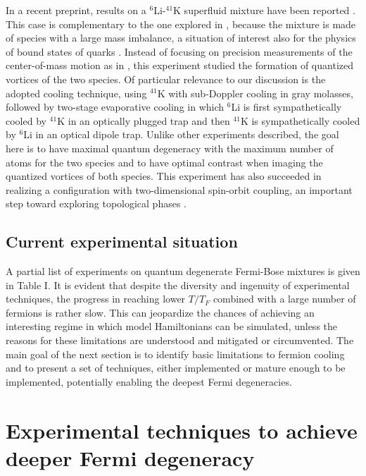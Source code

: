 \documentclass[pra,letterpaper,twocolumn,showpacs,superscriptaddress]{revtex4}
\begin{document}
In a recent preprint, results on a ${}^6$Li-${}^{41}$K superfluid mixture have been reported \cite{Yao2016}. 
This case is complementary to the one explored in \cite{Ferrier2014,Delehaye2015}, because the mixture is 
made of species with a large mass imbalance, a situation of interest also for the physics of bound states of quarks 
\cite{Casalbuoni2004}. Instead of focusing on precision measurements of the center-of-mass motion as in 
\cite{Ferrier2014,Delehaye2015}, this experiment studied the formation of quantized vortices of the two species. 
Of particular relevance to our discussion is the adopted cooling technique, using ${}^{41}$K with sub-Doppler 
cooling in gray molasses, followed by two-stage evaporative cooling  in which ${}^6$Li is first 
sympathetically cooled by ${}^{41}$K in an optically plugged trap and then ${}^{41}$K is sympathetically cooled 
by ${}^6$Li in an optical dipole trap. Unlike other experiments described, the goal here is to have maximal 
quantum degeneracy with the maximum number of atoms for the two species and to have optimal contrast when 
imaging the quantized vortices of both species. This experiment has also succeeded in realizing a configuration 
with two-dimensional spin-orbit coupling, an important step toward exploring topological phases \cite{Huang2016}.

\subsection{Current experimental situation}

A partial list of experiments on quantum degenerate Fermi-Bose mixtures is given in Table I. 
It is evident that despite the diversity and ingenuity of experimental techniques, the 
progress in reaching lower $T/T_F$ combined with a large number of fermions is rather slow. 
This can jeopardize the chances of achieving an interesting regime in which model Hamiltonians can 
be simulated, unless the reasons for these limitations are understood and mitigated or circumvented. 
The main goal of the next section is to identify basic limitations to fermion cooling and to present 
a set of techniques, either implemented or mature enough to be implemented, potentially enabling 
the deepest Fermi degeneracies.

\section{Experimental techniques to achieve deeper Fermi degeneracy} 
\end{document}
